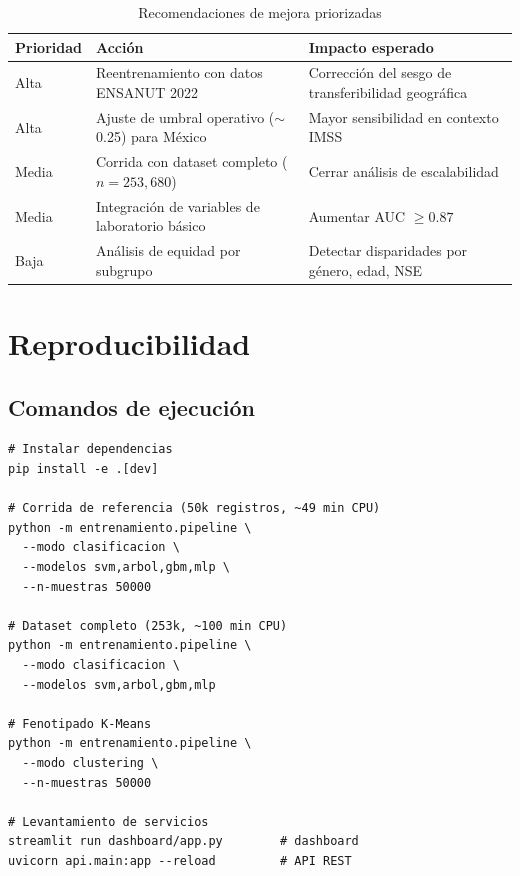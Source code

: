 \documentclass[12pt,a4paper]{article}
\begin{document}
\begin{table}[H]
  \centering
  \caption{Recomendaciones de mejora priorizadas}
  \begin{tabularx}{\linewidth}{llX}
    \toprule
    \textbf{Prioridad} & \textbf{Acción} & \textbf{Impacto esperado}\\
    \midrule
    Alta & Reentrenamiento con datos ENSANUT 2022 & Corrección del sesgo de transferibilidad geográfica\\
    Alta & Ajuste de umbral operativo ($\sim$0.25) para México & Mayor sensibilidad en contexto IMSS\\
    Media & Corrida con dataset completo ($n=253{,}680$) & Cerrar análisis de escalabilidad\\
    Media & Integración de variables de laboratorio básico & Aumentar AUC $\geq 0.87$\\
    Baja & Análisis de equidad por subgrupo & Detectar disparidades por género, edad, NSE\\
    \bottomrule
  \end{tabularx}
\end{table}

\section{Reproducibilidad}

\subsection{Comandos de ejecución}

\begin{lstlisting}[caption={Reproducción completa del pipeline de entrenamiento}]
# Instalar dependencias
pip install -e .[dev]

# Corrida de referencia (50k registros, ~49 min CPU)
python -m entrenamiento.pipeline \
  --modo clasificacion \
  --modelos svm,arbol,gbm,mlp \
  --n-muestras 50000

# Dataset completo (253k, ~100 min CPU)
python -m entrenamiento.pipeline \
  --modo clasificacion \
  --modelos svm,arbol,gbm,mlp

# Fenotipado K-Means
python -m entrenamiento.pipeline \
  --modo clustering \
  --n-muestras 50000

# Levantamiento de servicios
streamlit run dashboard/app.py        # dashboard
uvicorn api.main:app --reload         # API REST
\end{lstlisting}
\end{document}
